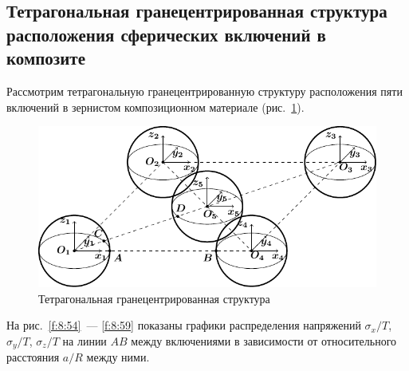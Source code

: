 \begin{russian}
%

\subsection{Тетрагональная гранецентрированная структура расположения сферических включений в композите}

Рассмотрим тетрагональную гранецентрированную структуру расположения пяти включений в зернистом композиционном материале (рис.~\ref{f:8:53}).

\begin{figure}[h!]
\centering
\includegraphics[width=15cm]{cartesian-spheres-5.pdf}
\caption{Тетрагональная гранецентрированная структура}
\label{f:8:53}
\end{figure}

На рис.~\ref{f:8:54}~--- \ref{f:8:59} показаны графики распределения напряжений $\sigma_x/T$, $\sigma_y/T$, $\sigma_z/T$ на линии $AB$ между включениями в зависимости от относительного расстояния $a/R$ между ними.


\end{russian}
